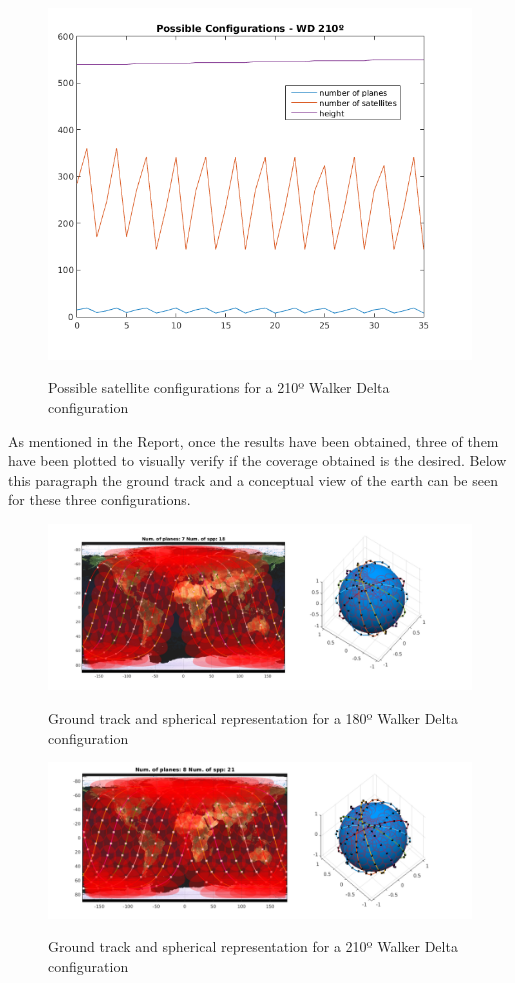 \begin{figure}[H] %
	\centering
	\includegraphics[width=.5\textwidth]{./testing/graph210.png}\\
	\caption{Possible satellite configurations for a 210º Walker Delta configuration}
	\label{fig:graph120}
\end{figure}

As mentioned in the Report, once the results have been obtained, three of them have been plotted to visually verify if the coverage obtained is the desired. Below this paragraph the ground track and a conceptual view of the earth can be seen for these three configurations.

\begin{figure}[H] %
	\centering
	\includegraphics[width=1\textwidth]{./testing/WB180.png}\\
	\caption{Ground track and spherical representation for a 180º Walker Delta configuration}
	\label{fig:graph120}
\end{figure}

\begin{figure}[H] %
	\centering
	\includegraphics[width=1\textwidth]{./testing/WB210.png}\\
	\caption{Ground track and spherical representation for a 210º Walker Delta configuration}
	\label{fig:graph120}
\end{figure}

